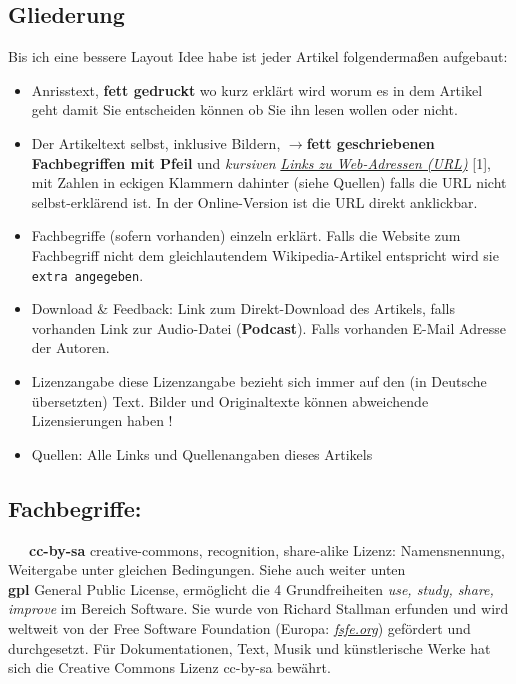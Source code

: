 
\subsection*{Gliederung}
Bis ich eine bessere Layout Idee habe ist jeder Artikel folgendermaßen aufgebaut:
\begin{itemize}
\item Anrisstext, \textbf{fett gedruckt} wo kurz erklärt wird worum es in dem Artikel geht damit Sie entscheiden können ob Sie ihn lesen wollen oder nicht.
\item Der Artikeltext selbst, inklusive Bildern, \textbf{$\rightarrow$fett geschriebenen Fachbegriffen mit Pfeil} und \textit{kursiven} \href{http://spielend-programmieren.at}{\textit{Links zu Web-Adressen (URL)}} [1], mit Zahlen in eckigen Klammern dahinter (siehe Quellen) falls die URL nicht selbst-erklärend ist. In der Online-Version ist die URL direkt anklickbar.
\item Fachbegriffe (sofern vorhanden) einzeln erklärt. Falls die Website zum Fachbegriff nicht dem gleichlautendem Wikipedia-Artikel entspricht wird sie \texttt{extra angegeben}.
\item Download \& Feedback: Link zum Direkt-Download des Artikels, falls vorhanden Link zur Audio-Datei (\textbf{Podcast}). Falls vorhanden E-Mail Adresse der Autoren.
\item Lizenzangabe diese Lizenzangabe bezieht sich immer auf den (in Deutsche übersetzten) Text. Bilder und Originaltexte können abweichende Lizensierungen haben ! 
\item Quellen: Alle Links und Quellenangaben dieses Artikels
\end{itemize}

\subsection*{Fachbegriffe:}

~~~\textbf{cc-by-sa} creative-commons, recognition, share-alike Lizenz:  Namensnennung, Weitergabe unter gleichen Bedingungen. Siehe auch weiter unten \\

\textbf{gpl} General Public License, ermöglicht die 4 Grundfreiheiten \emph{use, study, share, improve} im Bereich Software. Sie wurde von Richard Stallman erfunden und wird weltweit von der Free Software Foundation (Europa: \href{http://fsfe.org/}{\textit{fsfe.org}}) gefördert und durchgesetzt. Für Dokumentationen, Text, Musik und künstlerische Werke hat sich die Creative Commons Lizenz cc-by-sa bewährt. \\


